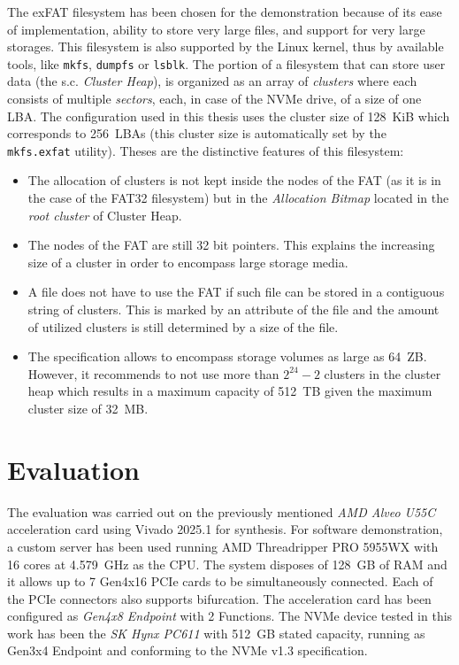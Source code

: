 The \ac{exFAT} filesystem has been chosen for the demonstration because of its ease of
implementation, ability to store very large files, and support for very large storages. This
filesystem is also supported by the Linux kernel, thus by available tools, like \verb|mkfs|,
\verb|dumpfs| or \verb|lsblk|. The portion of a filesystem that can store user data (the s.c.
\emph{Cluster Heap}), is organized as an array of \emph{clusters} where each consists of multiple
\emph{sectors}, each, in case of the NVMe drive, of a size of one \ac{LBA}\cite{exfat_spec}. The
configuration used in this thesis uses the cluster size of 128~KiB which corresponds to 256~LBAs
(this cluster size is automatically set by the \verb|mkfs.exfat| utility\cite{mkfs_manpage}). Theses
are the distinctive features of this filesystem:
\begin{itemize}
    \item The allocation of clusters is not kept inside the nodes of the \ac{FAT} (as it is in the
    case of the FAT32 filesystem) but in the \emph{Allocation Bitmap} located in the \emph{root
    cluster} of Cluster Heap.
    \item The nodes of the FAT are still 32 bit pointers. This explains the increasing size of a
    cluster in order to encompass large storage media.
    \item A file does not have to use the FAT if such file can be stored in a contiguous string of
    clusters. This is marked by an attribute of the file and the amount of utilized clusters is
    still determined by a size of the file.
    \item The specification allows to encompass storage volumes as large as 64~ZB. However, it
    recommends to not use more than $2^{24}-2$ clusters in the cluster heap which results in a
    maximum capacity of 512~TB given the maximum cluster size of 32~MB\cite{exfat_spec}.
\end{itemize}

\chapter{Evaluation}
\label{chap:eval}

The evaluation was carried out on the previously mentioned \emph{AMD Alveo U55C} acceleration
card\cite{alveo_u55c} using Vivado 2025.1 for synthesis. For software demonstration, a custom server
has been used running AMD Threadripper PRO 5955WX with 16 cores at 4.579~GHz as the CPU. The system
disposes of 128~GB of RAM and it allows up to 7 Gen4x16 PCIe cards to be simultaneously connected.
Each of the PCIe connectors also supports bifurcation. The acceleration card has been configured as
\emph{Gen4x8 Endpoint} with 2 Functions. The NVMe device tested in this work has been the \emph{SK
Hynx PC611} with 512~GB stated capacity, running as Gen3x4 Endpoint and conforming to the NVMe v1.3
specification.

